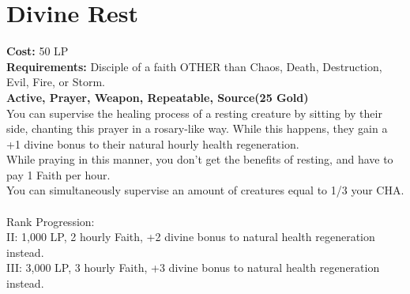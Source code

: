 \section{Divine Rest}\label{prayer:divineRest}
\textbf{Cost:} 50 LP\\
\textbf{Requirements:} Disciple of a faith OTHER than Chaos, Death, Destruction, Evil, Fire, or Storm.\\
\textbf{Active, Prayer, Weapon, Repeatable, Source(25 Gold)}\\
You can supervise the healing process of a resting creature by sitting by their side, chanting this prayer in a rosary-like way.
While this happens, they gain a +1 divine bonus to their natural hourly health regeneration.\\
While praying in this manner, you don't get the benefits of resting, and have to pay 1 Faith per hour.\\
You can simultaneously supervise an amount of creatures equal to 1/3 your CHA.\\
\\
Rank Progression:\\
II: 1,000 LP, 2 hourly Faith, +2 divine bonus to natural health regeneration instead.\\
III: 3,000 LP, 3 hourly Faith, +3 divine bonus to natural health regeneration instead.\\